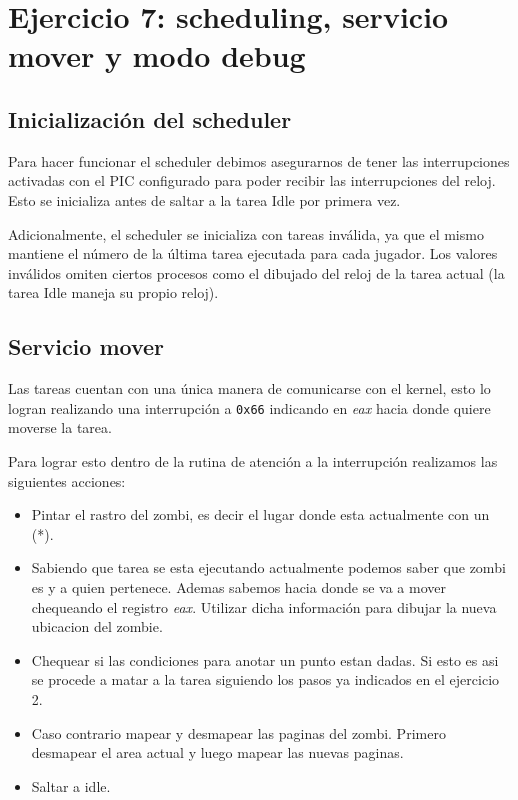 \section{Ejercicio 7: scheduling, servicio mover y modo debug}
    
    \subsection{Inicialización del scheduler}

    Para hacer funcionar el scheduler debimos asegurarnos de tener las interrupciones activadas con el PIC configurado para poder recibir las interrupciones del reloj. Esto se inicializa antes de saltar a la tarea Idle por primera vez.

    Adicionalmente, el scheduler se inicializa con tareas inválida, ya que el mismo mantiene el número de la última tarea ejecutada para cada jugador. Los valores inválidos omiten ciertos procesos como el dibujado del reloj de la tarea actual (la tarea Idle maneja su propio reloj).

	\subsection{Servicio mover}
	Las tareas cuentan con una única manera de comunicarse con el kernel, esto lo logran realizando una interrupción a \texttt{0x66} indicando en \textit{eax} hacia donde quiere moverse la tarea.

	Para lograr esto dentro de la rutina de atención a la interrupción realizamos las siguientes acciones:

	\begin{itemize}
		\item Pintar el rastro del zombi, es decir el lugar donde esta actualmente con un (*).

		\item Sabiendo que tarea se esta ejecutando actualmente podemos saber que zombi es y a quien pertenece. Ademas sabemos hacia donde se va a mover chequeando el registro \textit{eax}. Utilizar dicha información para dibujar la nueva ubicacion del zombie.

		\item Chequear si las condiciones para anotar un punto estan dadas. Si esto es asi se procede a matar a la tarea siguiendo los pasos ya indicados en el ejercicio 2.

		\item Caso contrario mapear y desmapear las paginas del zombi. Primero desmapear el area actual y luego mapear las nuevas paginas.

		\item Saltar a idle.
	\end{itemize}

